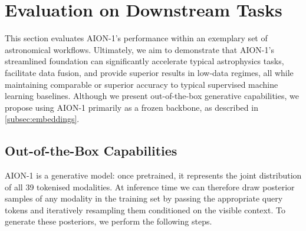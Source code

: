 \documentclass[]{polymathic}
\begin{document}
\section{Evaluation on Downstream Tasks}

This section evaluates AION-1's performance within an exemplary set of astronomical workflows. Ultimately, we aim to demonstrate that AION-1's streamlined foundation can significantly accelerate typical astrophysics tasks, facilitate data fusion, and provide superior results in low-data regimes, all while maintaining comparable or superior accuracy to typical supervised machine learning baselines. Although we present out-of-the-box generative capabilities, we propose using AION-1 primarily as a frozen backbone, as described in \cref{subsec:embeddings}.

\subsection{Out-of-the-Box Capabilities}

AION-1 is a generative model: once pretrained, it represents the joint distribution of all 39 tokenised modalities. At inference time we can therefore draw posterior samples of any modality in the training set by passing the appropriate query tokens and iteratively resampling them conditioned on the visible context. To generate these posteriors, we perform the following steps. 
\end{document}
